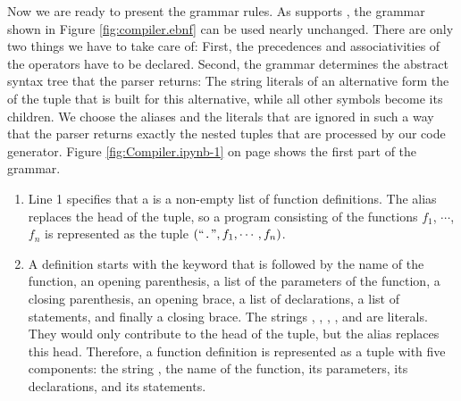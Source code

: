 Now we are ready to present the grammar rules.  As  supports , the grammar
shown in Figure \ref{fig:compiler.ebnf} can be used nearly unchanged.  There are only two things we have to take
care of: First, the precedences and associativities of the operators have to be declared.  Second, the grammar
determines the abstract syntax tree that the parser returns:  The string literals of an alternative form the
 of the tuple that is built for this alternative, while all other symbols become its children.  We
choose the aliases and the literals that are ignored in such a way that the parser returns exactly the nested
tuples that are processed by our code generator.
Figure \ref{fig:Compiler.ipynb-1} on page \pageref{fig:Compiler.ipynb-1} shows the first part of the grammar.
\begin{enumerate}
\item Line 1 specifies that a  is a non-empty list of function definitions.  The alias
       replaces the head of the tuple, so a program consisting of the functions $f_1$, $\cdots$, $f_n$
      is represented as the tuple $(\mbox{``\texttt{.}''}, f_1, \cdots, f_n)$.
\item A  definition starts with the keyword  that is followed by the name of the
      function, an opening parenthesis, a list of the parameters of the function, a closing parenthesis,
      an opening brace, a list of declarations, a list of statements, and finally a closing brace.
      The strings , \quoted{(}, \quoted{)}, \quoted{\{}, and \quoted{\}} are literals.  They would
      only contribute to the head of the tuple, but the alias  replaces this head.  Therefore, a
      function definition is represented as a tuple with five components:  the string , the name of
      the function, its parameters, its declarations, and its statements.


\end{enumerate}
